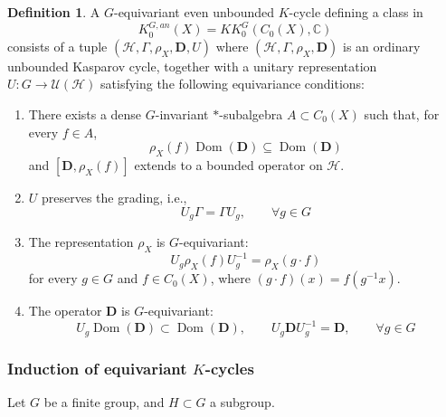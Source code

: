 \documentclass[11pt,leqno,twoside]{amsart}
\theoremstyle{plainsl}
\theoremstyle{definition}
\newtheorem{definition}[theorem]{Definition}
\newcommand{\C}{\mathbb{C}}
\newcommand{\bD}{\mathbf{D}}
\begin{document}
\begin{definition}\label{equivkkdef}\cite{FR}
A $G$-equivariant even
unbounded $K$-cycle defining a class in
\[
K_0^{G,an}(X)=KK_0^G(C_0(X),\C)
\]
consists of a tuple
$(\mathcal H,\Gamma,\rho_X,\bD,U)$ where \((\mathcal H,\Gamma,\rho_X,\mathbf D)\) is an ordinary unbounded Kasparov cycle, together with a unitary representation \(U:G\to\mathcal U(\mathcal H)\) satisfying the following equivariance conditions:

\begin{enumerate}[label=(\alph*)]


  \item There exists a dense $G$-invariant
    $\ast$-subalgebra $A\subset C_0(X)$ such that,
    for every $f\in A$,
    \[
    \rho_X(f)\operatorname{Dom}(\bD)
    \subseteq\operatorname{Dom}(\bD)
    \]
    and $[\bD,\rho_X(f)]$ extends to a bounded
    operator on $\mathcal H$.

    \item  $U$  preserves the grading, i.e.,
    \[
    U_g\Gamma=\Gamma U_g,
    \qquad \forall g\in G
    \]


     \item The representation $\rho_X$ is $G$-equivariant:
    \[
    U_g\rho_X(f)U_g^{-1}
    =\rho_X(g\cdot f)
    \]
    for every $g\in G$ and $f\in C_0(X)$, where
    $(g\cdot f)(x)=f(g^{-1}x)$.


  \item The operator $\bD$ is $G$-equivariant:
    \[
    U_g\operatorname{Dom}(\bD)
    \subset\operatorname{Dom}(\bD),
    \qquad
    U_g\bD U_g^{-1}=\bD,
    \qquad \forall g\in G
    \]
\end{enumerate}
\end{definition}




\subsubsection{Induction of equivariant $K$-cycles}\label{inductkcycles} Let $G$ be a finite group, and $H\subset G$ a subgroup. 
\end{document}
